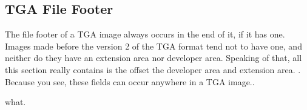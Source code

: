 \begin{refsection}
\section{TGA File Footer}

The file footer of a TGA image always occurs in the end of it, if it
has one. Images made before the version 2 of the TGA format tend not
to have one, and neither do they have an extension area nor
developer area. Speaking of that, all this section really contains
is the offset the developer area and extension area. . Because you see, these fields can occur
anywhere in a TGA image..

what.

\printbibliography[heading=subbibliography]

\end{refsection}